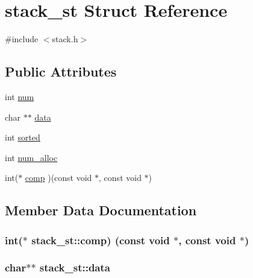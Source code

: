 \hypertarget{structstack__st}{}\section{stack\+\_\+st Struct Reference}
\label{structstack__st}


{\ttfamily \#include $<$stack.\+h$>$}

\subsection*{Public Attributes}
\begin{DoxyCompactItemize}
\item 
int \hyperlink{structstack__st_af60cc588694f5798623d33fe70946748}{num}
\item 
char $\ast$$\ast$ \hyperlink{structstack__st_af7d6fc34731b1971666de50613a0fb53}{data}
\item 
int \hyperlink{structstack__st_a8bc2f5dfd119fa8339637dfbca8251d9}{sorted}
\item 
int \hyperlink{structstack__st_a4ad771fe5551133410de60b2e8b2028d}{num\+\_\+alloc}
\item 
int($\ast$ \hyperlink{structstack__st_a91ae59f4cee454d2eef6dc1635e9cf46}{comp} )(const void $\ast$, const void $\ast$)
\end{DoxyCompactItemize}


\subsection{Member Data Documentation}
\subsubsection[{\texorpdfstring{comp}{comp}}]{\setlength{\rightskip}{0pt plus 5cm}int($\ast$ stack\+\_\+st\+::comp) (const void $\ast$, const void $\ast$)}\hypertarget{structstack__st_a91ae59f4cee454d2eef6dc1635e9cf46}{}\label{structstack__st_a91ae59f4cee454d2eef6dc1635e9cf46}
\subsubsection[{\texorpdfstring{data}{data}}]{\setlength{\rightskip}{0pt plus 5cm}char$\ast$$\ast$ stack\+\_\+st\+::data}\hypertarget{structstack__st_af7d6fc34731b1971666de50613a0fb53}{}\label{structstack__st_af7d6fc34731b1971666de50613a0fb53}
